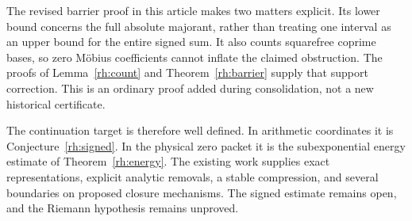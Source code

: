 The revised barrier proof in this article makes two matters explicit. Its lower bound concerns the full absolute majorant, rather than treating one interval as an upper bound for the entire signed sum. It also counts squarefree coprime bases, so zero Möbius coefficients cannot inflate the claimed obstruction. The proofs of Lemma~\ref{rh:count} and Theorem~\ref{rh:barrier} supply that support correction. This is an ordinary proof added during consolidation, not a new historical certificate.

The continuation target is therefore well defined. In arithmetic coordinates it is Conjecture~\ref{rh:signed}. In the physical zero packet it is the subexponential energy estimate of Theorem~\ref{rh:energy}. The existing work supplies exact representations, explicit analytic removals, a stable compression, and several boundaries on proposed closure mechanisms. The signed estimate remains open, and the Riemann hypothesis remains unproved.

